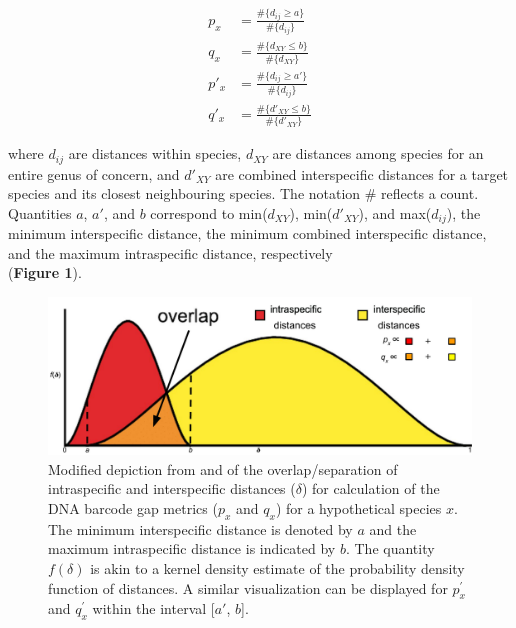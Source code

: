\documentclass[12pt]{article}
\begin{document}
\begin{align}
p_x &= \frac{\#\{d_{ij} \geq a\}}{\#\{d_{ij}\}} \\[1mm]
q_x &= \frac{\#\{d_{XY} \leq b\}}{\#\{d_{XY}\}} \\[1mm]
p'_x &= \frac{\#\{d_{ij} \geq a'\}}{\#\{d_{ij}\}} \\[1mm]
q'_x &= \frac{\#\{d'_{XY} \leq b\}}{\#\{d'_{XY}\}}
\end{align}

\noindent where $d_{ij}$ are distances within species, $d_{XY}$ are distances among species for an entire genus of concern, and $d'_{XY}$ are combined interspecific distances for a target species and its closest neighbouring species. The notation \# reflects a count.  Quantities $a$, $a'$, and $b$ correspond to min($d_{XY}$), min($d'_{XY}$), and max($d_{ij}$), the minimum interspecific distance, the minimum combined interspecific distance, and the maximum intraspecific distance, respectively \\ (\textbf{Figure 1}). 

\begin{figure}[H]

\centering

\includegraphics[width=1.0\textwidth]{Figure1}

\caption{Modified depiction from \citet{meyer2005dna} and \citet{phillips2024measure} of the overlap/separation of intraspecific and interspecific distances ($\delta$) for calculation of the DNA barcode gap metrics ($p_x$ and $q_x$) for a hypothetical species $x$. The minimum interspecific distance is denoted by $a$ and the maximum intraspecific distance is indicated by $b$. The quantity $f(\delta)$ is akin to a kernel density estimate of the probability density function of distances. A similar visualization can be displayed for $p^{'}_x$ and $q^{'}_x$ within the interval [$a'$, $b$].}

\end{figure}
\end{document}
